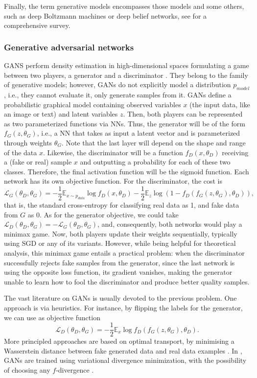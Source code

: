 Finally, the term generative models 
encompasses those models and some others, such as deep Boltzmann machines or deep belief networks, see \cite{doi:10.1146/annurev-statistics-010814-020120} for a comprehensive survey.

\subsubsection{Generative adversarial networks} GANS  perform density estimation in high-dimensional spaces formulating a game between two players, a generator and a discriminator \cite{goodfellow2014generative}. They belong to the family of generative models; however, GANs do not explicitly model a distribution $p_{model}$, i.e., they cannot evaluate it, only generate samples from it.
GANs define a probabilistic graphical model containing observed variables $x$ (the input data, like an image or text) and latent variables $z$. Then, both players can be represented as two parameterized functions via NNs. Thus, the generator will be of the form $f_G(z, \theta_G)$, i.e., a NN that takes as input a latent vector and is parameterized through weights $\theta_G$. Note that the last layer will depend on the shape and range of the data $x$. Likewise, the discriminator will be a function $f_D(x, \theta_D)$ receiving a (fake or real) sample $x$ and outputting a probability for each of these two classes. Therefore, the final activation function will be 
the sigmoid function. Each network has its own objective function. For the discriminator, the cost is
$$
\mathcal{L}_G(\theta_D, \theta_G) = -\dfrac{1}{2} \mathbb{E}_{x \sim p_{data}} \log f_D(x, \theta_D) -\dfrac{1}{2} \mathbb{E}_z \log (1 - f_D(f_G(z, \theta_G), \theta_D)),
$$
that is, the standard cross-entropy for classifying real data as 1, and fake data from $G$ as 0. As for the generator objective, we could take $\mathcal{L}_D(\theta_D, \theta_G) = -\mathcal{L}_G(\theta_D, \theta_G)$,
and, consequently, both networks would play a minimax game.
Now, both players update their weights sequentially, typically using SGD or any of its variants.
However, while being helpful for theoretical analysis, 
this minimax game entails a practical problem: when the discriminator successfully rejects fake samples from the generator, since the last network is using the opposite loss function, its gradient vanishes, making the generator unable to learn how to fool the discriminator and produce better quality samples.

The vast literature on GANs is usually devoted to the previous problem. One approach is via heuristics. For instance, by flipping the labels for the generator, we can use as objective function
$$
\mathcal{L}_D(\theta_D, \theta_G) = -\dfrac{1}{2} \mathbb{E}_{x} \log f_D(f_G(z, \theta_G), \theta_D).
$$
More principled approaches are based on optimal transport, by minimising a Wasserstein distance between fake generated data and real data examples \cite{arjovsky2017wasserstein}. In \cite{nowozin2016f}, GANs are trained using variational divergence minimization, with the possibility of choosing any $f$-divergence \cite{CIT-004}.

